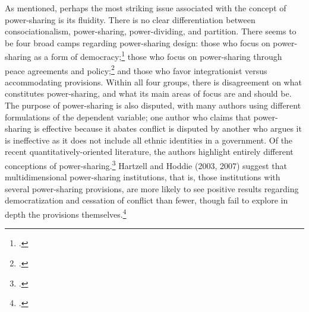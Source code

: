 \documentclass[12pt]{article}
\begin{document}
As mentioned, perhaps the most striking issue associated with the concept of power-sharing is its fluidity. There is no clear differentiation between consociationalism, power-sharing, power-dividing, and partition. There seems to be four broad camps regarding power-sharing design: those who focus on power-sharing as a form of democracy;\footcite{barry_consociational_1975, lijphart_consociational_1974, norris_evidence_2008, steiner_research_1981} those who focus on power-sharing through peace agreements and policy;\footcite{hartzell_institutionalizing_2003, hartzell_crafting_2007, mukherjee_why_2006} and those who favor integrationist versus accommodating provisions. Within all four groups, there is disagreement on what constitutes power-sharing, and what its main areas of focus are and should be. The purpose of power-sharing is also disputed, with many authors using different formulations of the dependent variable; one author who claims that power-sharing is effective because it abates conflict is disputed by another who argues it is ineffective as it does not include all ethnic identities in a government. Of the recent quantitatively-oriented literature, the authors highlight entirely different conceptions of power-sharing.\footcite{hartzell_institutionalizing_2003, hartzell_crafting_2007, graham_safeguarding_2017, jarstad_words_2008, mattes_fostering_2009, strom_inclusion_2017, walter_committing_2002} Hartzell and Hoddie (2003, 2007) suggest that multidimensional power-sharing institutions, that is, those institutions with several power-sharing provisions, are more likely to see positive results regarding democratization and cessation of conflict than fewer, though fail to explore in depth the provisions themselves.\footcite[325-332]{hartzell_institutionalizing_2003}
\end{document}

